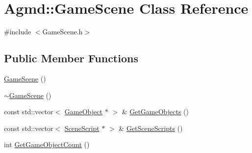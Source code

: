 \hypertarget{class_agmd_1_1_game_scene}{\section{Agmd\+:\+:Game\+Scene Class Reference}
\label{class_agmd_1_1_game_scene}
}


{\ttfamily \#include $<$Game\+Scene.\+h$>$}

\subsection*{Public Member Functions}
\begin{DoxyCompactItemize}
\item 
\hyperlink{class_agmd_1_1_game_scene_ace55ffe55cfd8140388282c228d87100}{Game\+Scene} ()
\item 
\hyperlink{class_agmd_1_1_game_scene_a352ebd15077e3888600f434d821fa36c}{$\sim$\+Game\+Scene} ()
\item 
const std\+::vector$<$ \hyperlink{class_agmd_1_1_game_object}{Game\+Object} $\ast$ $>$ \& \hyperlink{class_agmd_1_1_game_scene_a4b33be00b8bd0ebd50be098ff0d2d8d8}{Get\+Game\+Objects} ()
\item 
const std\+::vector$<$ \hyperlink{class_agmd_1_1_scene_script}{Scene\+Script} $\ast$ $>$ \& \hyperlink{class_agmd_1_1_game_scene_a2ba7a8b4140879e7c8b083a2aab4829e}{Get\+Scene\+Scripts} ()
\item 
int \hyperlink{class_agmd_1_1_game_scene_a7aa3a55059b1a6b2ff1e77b801b0e3c3}{Get\+Game\+Object\+Count} ()
\end{DoxyCompactItemize}


